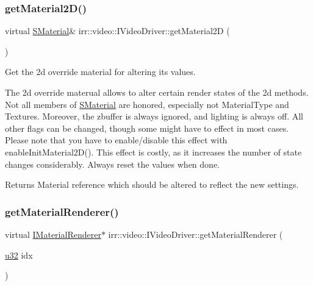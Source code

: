 \subsubsection{\texorpdfstring{get\+Material2\+D()}{getMaterial2D()}\hspace{0.1cm}{\footnotesize\ttfamily [2/2]}}
{\footnotesize\ttfamily virtual \hyperlink{classirr_1_1video_1_1SMaterial}{S\+Material}\& irr\+::video\+::\+I\+Video\+Driver\+::get\+Material2D (\begin{DoxyParamCaption}{ }\end{DoxyParamCaption})\hspace{0.3cm}{\ttfamily [pure virtual]}}



Get the 2d override material for altering its values. 

The 2d override materual allows to alter certain render states of the 2d methods. Not all members of \hyperlink{classirr_1_1video_1_1SMaterial}{S\+Material} are honored, especially not Material\+Type and Textures. Moreover, the zbuffer is always ignored, and lighting is always off. All other flags can be changed, though some might have to effect in most cases. Please note that you have to enable/disable this effect with enable\+Init\+Material2\+D(). This effect is costly, as it increases the number of state changes considerably. Always reset the values when done. \begin{DoxyReturn}{Returns}
Material reference which should be altered to reflect the new settings. 
\end{DoxyReturn}
\mbox{\label{classirr_1_1video_1_1IVideoDriver_accb321dfb32ad3c76efb99427bc90cc8}} 
\subsubsection{\texorpdfstring{get\+Material\+Renderer()}{getMaterialRenderer()}\hspace{0.1cm}{\footnotesize\ttfamily [1/2]}}
{\footnotesize\ttfamily virtual \hyperlink{classirr_1_1video_1_1IMaterialRenderer}{I\+Material\+Renderer}$\ast$ irr\+::video\+::\+I\+Video\+Driver\+::get\+Material\+Renderer (\begin{DoxyParamCaption}\item[{\hyperlink{namespaceirr_a0416a53257075833e7002efd0a18e804}{u32}}]{idx }\end{DoxyParamCaption})\hspace{0.3cm}{\ttfamily [pure virtual]}}



